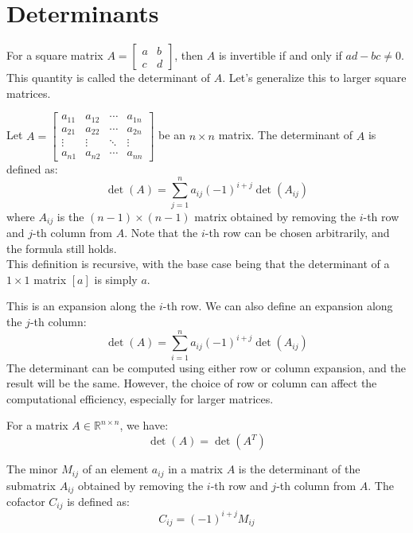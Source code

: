 \chapter{Determinants}
For a square matrix \(A = \begin{bmatrix}
    a & b \\
    c & d
\end{bmatrix}\), then $A$ is invertible if and only if \(ad - bc \neq 0\). This quantity is called the determinant of $A$. Let's generalize this to larger square matrices.
\begin{definition}[Determinant]
    Let $A = \begin{bmatrix}
        a_{11} & a_{12} & \cdots & a_{1n} \\
        a_{21} & a_{22} & \cdots & a_{2n} \\
        \vdots & \vdots & \ddots & \vdots \\
        a_{n1} & a_{n2} & \cdots & a_{nn}
    \end{bmatrix}$ be an \(n \times n\) matrix. The determinant of $A$ is defined as:
    \[
        \det(A) = \sum_{j = 1}^{n} a_{ij} (-1)^{i+j} \det(A_{ij})
    \]
    where \(A_{ij}\) is the \((n-1) \times (n-1)\) matrix obtained by removing the \(i\)-th row and \(j\)-th column from $A$. Note that the $i$-th row can be chosen arbitrarily, and the formula still holds. \\ 
    This definition is recursive, with the base case being that the determinant of a \(1 \times 1\) matrix \([a]\) is simply \(a\).
\end{definition}
This is an expansion along the \(i\)-th row. We can also define an expansion along the \(j\)-th column:
\[
    \det(A) = \sum_{i = 1}^{n} a_{ij} (-1)^{i+j} \det(A_{ij})
\]
The determinant can be computed using either row or column expansion, and the result will be the same. However, the choice of row or column can affect the computational efficiency, especially for larger matrices.

\begin{theorem}
    For a matrix $A \in \mathbb{R}^{n \times n}$, we have:
    \[
        \det(A) = \det(A^T)
    \]
\end{theorem}

\begin{definition}
    The minor \(M_{ij}\) of an element \(a_{ij}\) in a matrix $A$ is the determinant of the submatrix \(A_{ij}\) obtained by removing the \(i\)-th row and \(j\)-th column from $A$. The cofactor \(C_{ij}\) is defined as:
    \[
        C_{ij} = (-1)^{i+j} M_{ij}
    \]
\end{definition}

